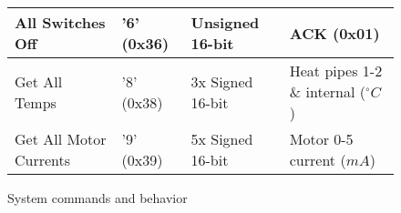 \documentclass{article}
\begin{document}
\begin{figure}[!h]
\begin{center}
\begin{tabular}{l|l|ll}
\hline
All Switches Off & '6' (0x36) & Unsigned 16-bit & ACK (0x01) \\ 
\hline
Get All Temps & '8' (0x38) & 3x Signed 16-bit & Heat pipes 1-2 \& internal ($^\circ C$)\\ 
Get All Motor Currents & '9' (0x39) & 5x Signed 16-bit & Motor 0-5 current ($mA$)\\ 

\end{tabular}
\caption{System commands and behavior}
\label{fig:commandlisting}
\end{center}
\end{figure}
\end{document}
